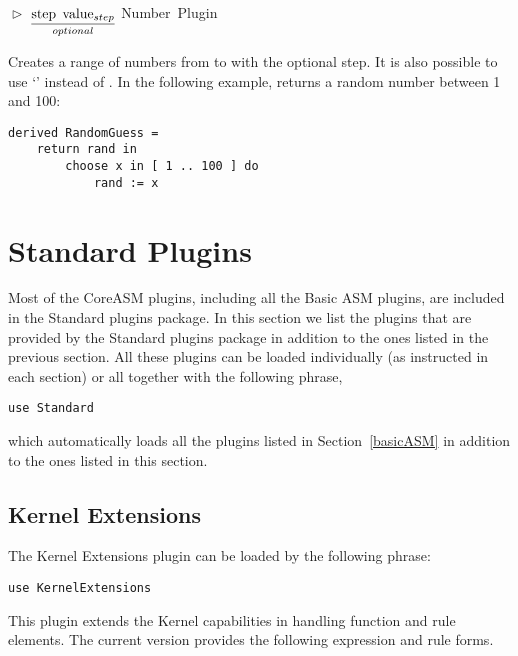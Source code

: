 \documentclass{article}
\newcommand{\CoreASM}{{\sffamily CoreASM}\xspace}
\newcommand{\opform}[2]{\pform{$\vartriangleright$}{#1}{#2}}
\newcommand{\pform}[3]{\vspace*{4mm} \noindent #1 #2 \vspace{1mm}\textcolor[gray]{0.7}{\dotfill}\mbox{{\sffamily \footnotesize #3}}}
\newcommand{\optional}[1]{$\underset{optional}{\underline{\mbox{#1}}}$}
\begin{document}
\opform{
	\asm{[ value$_{start}$ .. value$_{end}$}
	\optional{\asm{step value$_{step}$}}
	\asm{]}
}{Number Plugin}

Creates a range of numbers from  to  with the optional step. It is 
also possible to use `\asm{:}' instead of .
In the following example,  returns a random number between 1 and 100:

\begin{lstlisting}
derived RandomGuess =
	return rand in
		choose x in [ 1 .. 100 ] do
			rand := x
\end{lstlisting}


\section{Standard Plugins}
\label{standard}

Most of the \CoreASM plugins, including all the Basic ASM plugins, are included in the Standard plugins package. 
In this section we list the plugins that are provided by the Standard plugins package in addition to the ones 
listed in the previous section. All
these plugins can be loaded individually (as instructed in each
section) or all together with the following  phrase, 

\begin{lstlisting}
use Standard
\end{lstlisting}

\noindent which automatically loads all the plugins listed in Section~\ref{basicASM} 
in addition to the ones listed in this section.


\subsection{Kernel Extensions}
\label{kernelext}

The Kernel Extensions plugin can be loaded by the following  phrase:

\begin{lstlisting}
use KernelExtensions
\end{lstlisting}

This plugin extends the Kernel capabilities in handling function and rule elements. The current version provides the following expression and rule forms. 
\end{document}
